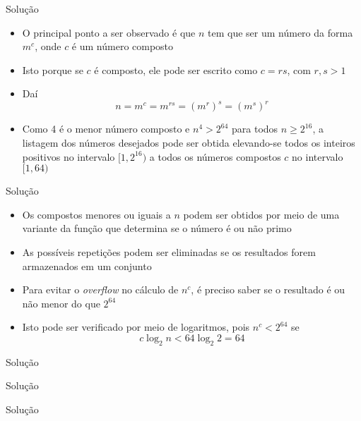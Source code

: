 \begin{frame}[fragile]{Solução}

    \begin{itemize}
        \item O principal ponto a ser observado é que $n$ tem que ser um número da forma
            $m^c$, onde $c$ é um número composto

        \item Isto porque se $c$ é composto, ele pode ser escrito como $c = rs$, com $r, s > 1$

        \item Daí
        $$
            n = m^c = m^{rs} = (m^r)^s = (m^s)^r
        $$

        \item Como 4 é o menor número composto e $n^4 > 2^{64}$ para todos $n \geq 2^{16}$,
            a listagem dos números desejados pode ser obtida elevando-se todos os inteiros
            positivos no intervalo $[1, 2^{16})$ a todos os números compostos $c$ no intervalo
            $[1, 64)$

    \end{itemize}

\end{frame}

\begin{frame}[fragile]{Solução}

    \begin{itemize}
        \item Os compostos menores ou iguais a $n$ podem ser obtidos por meio de uma variante da
        função que determina se o número é ou não primo

        \item As possíveis repetições podem ser eliminadas se os resultados forem armazenados em
            um conjunto

        \item Para evitar o \textit{overflow} no cálculo de $n^c$, é preciso saber se o resultado
            é ou não menor do que $2^{64}$

        \item Isto pode ser verificado por meio de logaritmos, pois $n^c < 2^{64}$ se
        $$
            c\log_2 n < 64\log_2 2 = 64
        $$

    \end{itemize}

\end{frame}

\begin{frame}[fragile]{Solução}
\end{frame}

\begin{frame}[fragile]{Solução}
\end{frame}

\begin{frame}[fragile]{Solução}
\end{frame}
